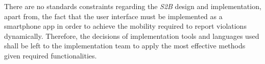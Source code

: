 There are no standards constraints regarding the \emph{S2B} design and implementation, apart from, the fact that the user interface must be implemented as a smartphone app in order to achieve the mobility required to report violations dynamically. Therefore, the decisions of implementation tools and languages used shall be left to the implementation team to apply the most effective methods given required functionalities. 